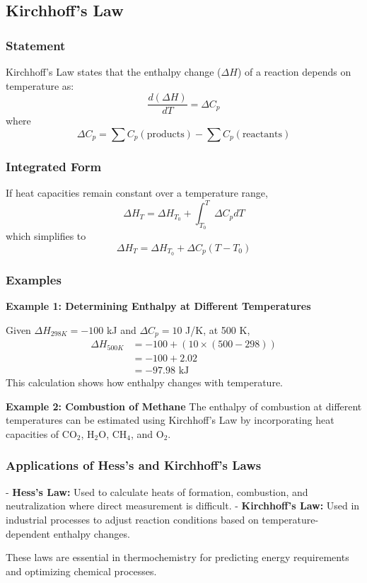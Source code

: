 \documentclass{article}
\theoremstyle{definition}
\begin{document}
\subsection{Kirchhoff’s Law}

\subsubsection{Statement}
Kirchhoff’s Law states that the enthalpy change (\(\Delta H\)) of a reaction depends on temperature as:
\begin{equation}
\frac{d(\Delta H)}{dT} = \Delta C_p
\end{equation}
where
\begin{equation}
\Delta C_p = \sum C_p(\text{products}) - \sum C_p(\text{reactants})
\end{equation}

\subsubsection{Integrated Form}
If heat capacities remain constant over a temperature range,
\begin{equation}
\Delta H_T = \Delta H_{T_0} + \int_{T_0}^{T} \Delta C_p dT
\end{equation}
which simplifies to
\begin{equation}
\Delta H_T = \Delta H_{T_0} + \Delta C_p (T - T_0)
\end{equation}

\subsubsection{Examples}
\textbf{Example 1: Determining Enthalpy at Different Temperatures}

Given \(\Delta H_{298K} = -100 \) kJ and \(\Delta C_p = 10 \) J/K, at 500 K,
\begin{align*}
\Delta H_{500K} &= -100 + (10 \times (500 - 298)) \\
                 &= -100 + 2.02 \\
                 &= -97.98 \text{ kJ}
\end{align*}
This calculation shows how enthalpy changes with temperature.

\textbf{Example 2: Combustion of Methane}
The enthalpy of combustion at different temperatures can be estimated using Kirchhoff’s Law by incorporating heat capacities of CO$_2$, H$_2$O, CH$_4$, and O$_2$.

\subsubsection{Applications of Hess's and Kirchhoff's Laws}
- \textbf{Hess’s Law:} Used to calculate heats of formation, combustion, and neutralization where direct measurement is difficult.
- \textbf{Kirchhoff’s Law:} Used in industrial processes to adjust reaction conditions based on temperature-dependent enthalpy changes.

These laws are essential in thermochemistry for predicting energy requirements and optimizing chemical processes.
\end{document}
